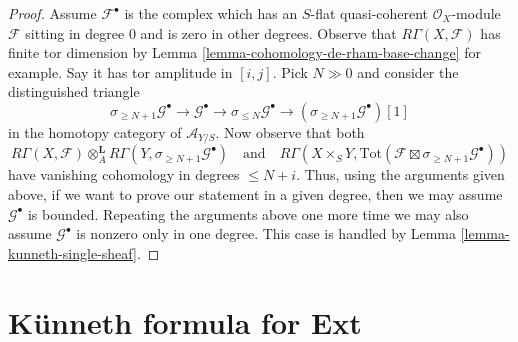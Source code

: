 \begin{proof}
\medskip\noindent
Assume $\mathcal{F}^\bullet$ is the complex which has an $S$-flat quasi-coherent
$\mathcal{O}_X$-module $\mathcal{F}$ sitting in degree $0$ and is zero in
other degrees. Observe that $R\Gamma(X, \mathcal{F})$ has finite
tor dimension by Lemma \ref{lemma-cohomology-de-rham-base-change} for example.
Say it has tor amplitude in $[i, j]$.
Pick $N \gg 0$ and consider the distinguished triangle
$$
\sigma_{\geq N + 1}\mathcal{G}^\bullet \to
\mathcal{G}^\bullet \to
\sigma_{\leq N}\mathcal{G}^\bullet \to
(\sigma_{\geq N + 1}\mathcal{G}^\bullet)[1]
$$
in the homotopy category of $\mathcal{A}_{Y/S}$. Now observe that both
$$
R\Gamma(X, \mathcal{F})
\otimes_A^\mathbf{L}
R\Gamma(Y, \sigma_{\geq N + 1}\mathcal{G}^\bullet)
\quad\text{and}\quad
R\Gamma(X \times_S Y,
\text{Tot}(\mathcal{F} \boxtimes \sigma_{\geq N + 1}\mathcal{G}^\bullet))
$$
have vanishing cohomology in degrees $\leq N + i$. Thus, using the arguments
given above, if we want to prove our statement in a given degree, then we may
assume $\mathcal{G}^\bullet$ is bounded.
Repeating the arguments above one more time we may also assume
$\mathcal{G}^\bullet$ is nonzero only in one degree.
This case is handled by Lemma \ref{lemma-kunneth-single-sheaf}.
\end{proof}







\section{K\"unneth formula for Ext}
\label{section-kunneth-Ext}

